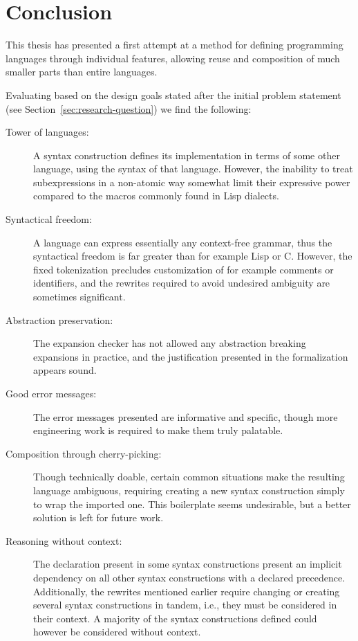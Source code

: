 \documentclass{kththesis}
\begin{document}
\section{Conclusion}

This thesis has presented a first attempt at a method for defining programming languages through individual features, allowing reuse and composition of much smaller parts than entire languages.

Evaluating based on the design goals stated after the initial problem statement (see Section~\ref{sec:research-question}) we find the following:

\begin{description}
  \item[Tower of languages:] A syntax construction defines its implementation in terms of some other language, using the syntax of that language. However, the inability to treat subexpressions in a non-atomic way somewhat limit their expressive power compared to the macros commonly found in Lisp dialects.

  \item[Syntactical freedom:] A language can express essentially any context-free grammar, thus the syntactical freedom is far greater than for example Lisp or C. However, the fixed tokenization precludes customization of for example comments or identifiers, and the rewrites required to avoid undesired ambiguity are sometimes significant.

  \item[Abstraction preservation:] The expansion checker has not allowed any abstraction breaking expansions in practice, and the justification presented in the formalization appears sound.

  \item[Good error messages:] The error messages presented are informative and specific, though more engineering work is required to make them truly palatable.

  \item[Composition through cherry-picking:] Though technically doable, certain common situations make the resulting language ambiguous, requiring creating a new syntax construction simply to wrap the imported one. This boilerplate seems undesirable, but a better solution is left for future work.

  \item[Reasoning without context:] The  declaration present in some syntax constructions present an implicit dependency on all other syntax constructions with a declared precedence. Additionally, the rewrites mentioned earlier require changing or creating several syntax constructions in tandem, i.e., they must be considered in their context. A majority of the syntax constructions defined could however be considered without context.
\end{description}
\end{document}
